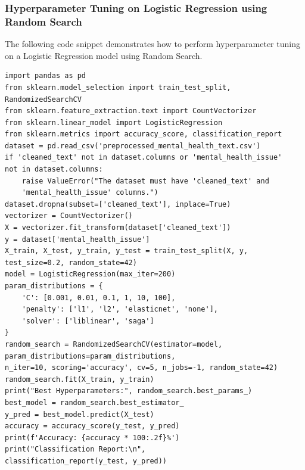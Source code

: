 \subsubsection{Hyperparameter Tuning on Logistic Regression using Random Search}

The following code snippet demonstrates how to perform hyperparameter tuning on a Logistic Regression model using Random Search.

\begin{verbatim}
import pandas as pd
from sklearn.model_selection import train_test_split, 
RandomizedSearchCV
from sklearn.feature_extraction.text import CountVectorizer
from sklearn.linear_model import LogisticRegression
from sklearn.metrics import accuracy_score, classification_report
dataset = pd.read_csv('preprocessed_mental_health_text.csv')
if 'cleaned_text' not in dataset.columns or 'mental_health_issue' 
not in dataset.columns:
    raise ValueError("The dataset must have 'cleaned_text' and 
    'mental_health_issue' columns.")
dataset.dropna(subset=['cleaned_text'], inplace=True)
vectorizer = CountVectorizer()
X = vectorizer.fit_transform(dataset['cleaned_text'])
y = dataset['mental_health_issue']
X_train, X_test, y_train, y_test = train_test_split(X, y, 
test_size=0.2, random_state=42)
model = LogisticRegression(max_iter=200)
param_distributions = {
    'C': [0.001, 0.01, 0.1, 1, 10, 100],
    'penalty': ['l1', 'l2', 'elasticnet', 'none'],
    'solver': ['liblinear', 'saga']
}
random_search = RandomizedSearchCV(estimator=model, 
param_distributions=param_distributions,
n_iter=10, scoring='accuracy', cv=5, n_jobs=-1, random_state=42)
random_search.fit(X_train, y_train)
print("Best Hyperparameters:", random_search.best_params_)
best_model = random_search.best_estimator_
y_pred = best_model.predict(X_test)
accuracy = accuracy_score(y_test, y_pred)
print(f'Accuracy: {accuracy * 100:.2f}%')
print("Classification Report:\n", 
classification_report(y_test, y_pred))
\end{verbatim}

